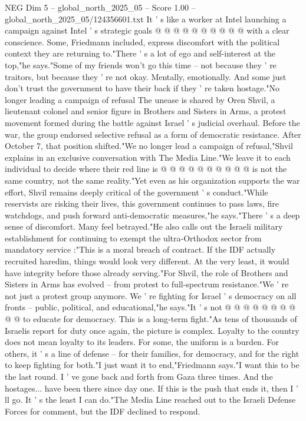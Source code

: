 \begin{textsample}{NEG Dim 5 – global\_north\_2025\_05 – Score 1.00 – global\_north\_2025\_05/124356601.txt}
It ' s like a worker at Intel launching a campaign against Intel ' s strategic goals @ @ @ @ @ @ @ @ @ @ with a clear conscience.
Some, Friedmann included, express discomfort with the political context they are returning to."There ' s a lot of ego and self-interest at the top,"he says."Some of my friends won't go this time -- not because they ' re traitors, but because they ' re not okay.
Mentally, emotionally.
And some just don't trust the government to have their back if they ' re taken hostage."No longer leading a campaign of refusal The unease is shared by Oren Shvil, a lieutenant colonel and senior figure in Brothers and Sisters in Arms, a protest movement formed during the battle against Israel ' s judicial overhaul.
Before the war, the group endorsed selective refusal as a form of democratic resistance.
After October 7, that position shifted."We no longer lead a campaign of refusal,"Shvil explains in an exclusive conversation with The Media Line."We leave it to each individual to decide where their red line is @ @ @ @ @ @ @ @ @ @ is not the same country, not the same reality."Yet even as his organization supports the war effort, Shvil remains deeply critical of the government ' s conduct."While reservists are risking their lives, this government continues to pass laws, fire watchdogs, and push forward anti-democratic measures,"he says."There ' s a deep sense of discomfort.
Many feel betrayed."He also calls out the Israeli military establishment for continuing to exempt the ultra-Orthodox sector from mandatory service :"This is a moral breach of contract.
If the IDF actually recruited haredim, things would look very different.
At the very least, it would have integrity before those already serving."For Shvil, the role of Brothers and Sisters in Arms has evolved -- from protest to full-spectrum resistance."We ' re not just a protest group anymore.
We ' re fighting for Israel ' s democracy on all fronts -- public, political, and educational,"he says."It ' s not @ @ @ @ @ @ @ @ @ @ to educate for democracy.
This is a long-term fight."As tens of thousands of Israelis report for duty once again, the picture is complex.
Loyalty to the country does not mean loyalty to its leaders.
For some, the uniform is a burden.
For others, it ' s a line of defense -- for their families, for democracy, and for the right to keep fighting for both."I just want it to end,"Friedmann says."I want this to be the last round.
I ' ve gone back and forth from Gaza three times.
And the hostages... have been there since day one.
If this is the push that ends it, then I ' ll go.
It ' s the least I can do."The Media Line reached out to the Israeli Defense Forces for comment, but the IDF declined to respond.

\end{textsample}
